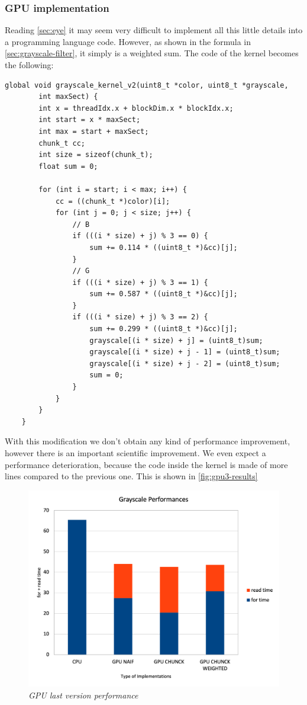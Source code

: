 \documentclass[paper=a4, fontsize=10pt]{scrartcl}	%
\begin{document}
	\subsubsection{GPU implementation}

	Reading \autoref{sec:eye} it may seem very difficult to implement all this little details into a programming language code. However, as shown in the formula in \autoref{sec:grayscale-filter}, it simply is a weighted sum. The code of the kernel becomes the following:

	\begin{lstlisting}[style=CStyle]
	global void grayscale_kernel_v2(uint8_t *color, uint8_t *grayscale, 
		int maxSect) {
		int x = threadIdx.x + blockDim.x * blockIdx.x;
		int start = x * maxSect;
		int max = start + maxSect;
		chunk_t cc;
		int size = sizeof(chunk_t);
		float sum = 0;
	
		for (int i = start; i < max; i++) {
			cc = ((chunk_t *)color)[i];
			for (int j = 0; j < size; j++) {
				// B
				if (((i * size) + j) % 3 == 0) {
					sum += 0.114 * ((uint8_t *)&cc)[j];
				}
				// G
				if (((i * size) + j) % 3 == 1) {
					sum += 0.587 * ((uint8_t *)&cc)[j];
				}
				if (((i * size) + j) % 3 == 2) {
					sum += 0.299 * ((uint8_t *)&cc)[j];
					grayscale[(i * size) + j] = (uint8_t)sum;
					grayscale[(i * size) + j - 1] = (uint8_t)sum;
					grayscale[(i * size) + j - 2] = (uint8_t)sum;
					sum = 0;
				}
			}
		}
	}
	\end{lstlisting}

	With this modification we don't obtain any kind of performance improvement, however there is an important scientific improvement. We even expect a performance deterioration, because the code inside the kernel is made of more lines compared to the previous one. This is shown in \autoref{fig:gpu3-results}
	
	\begin{figure}[H]
		\centering
		\includegraphics[width=0.65\linewidth]{images/bw/Picture 4.png}
		\caption{\textit{GPU last version performance}}
		\label{fig:gpu3-results}
	\end{figure}
	
\end{document}
